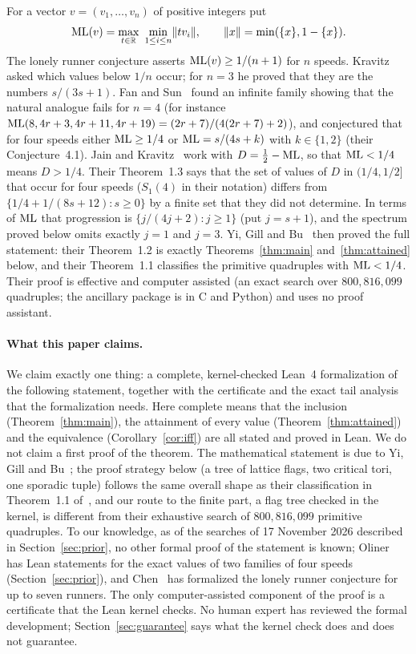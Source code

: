 \documentclass[11pt]{article}
\theoremstyle{remark}
\newcommand{\R}{\mathbb{R}}
\newcommand{\dist}[1]{\lVert #1\rVert}
\begin{document}
For a vector $v=(v_1,\dots,v_n)$ of positive integers put
\[
\ML(v)=\max_{t\in\R}\ \min_{1\le i\le n}\dist{tv_i},\qquad \dist{x}=\min(\{x\},1-\{x\}).
\]
The lonely runner conjecture asserts $\mathrm{ML}(v)\ge 1/(n+1)$ for $n$ speeds. Kravitz~\cite{Kravitz21} asked which values below $1/n$ occur; for $n=3$ he proved that they are the numbers $s/(3s+1)$. Fan and Sun~\cite{FanSun} found an infinite family showing that the natural analogue fails for $n=4$ (for instance $\mathrm{ML}(8,4r+3,4r+11,4r+19)=(2r+7)/(4(2r+7)+2)$), and conjectured that for four speeds either $\mathrm{ML}\ge1/4$ or $\mathrm{ML}=s/(4s+k)$ with $k\in\{1,2\}$ (their Conjecture~4.1). Jain and Kravitz~\cite{JK} work with $D=\tfrac12-\mathrm{ML}$, so that $\mathrm{ML}<1/4$ means $D>1/4$. Their Theorem~1.3 says that the set of values of $D$ in $(1/4,1/2]$ that occur for four speeds ($S_1(4)$ in their notation) differs from $\{1/4+1/(8s+12):s\ge0\}$ by a finite set that they did not determine. In terms of $\mathrm{ML}$ that progression is $\{j/(4j+2):j\ge1\}$ (put $j=s+1$), and the spectrum proved below omits exactly $j=1$ and $j=3$. Yi, Gill and Bu~\cite{YGB} then proved the full statement: their Theorem~1.2 is exactly Theorems~\ref{thm:main} and~\ref{thm:attained} below, and their Theorem~1.1 classifies the primitive quadruples with $\mathrm{ML}<1/4$. Their proof is effective and computer assisted (an exact search over $800{,}816{,}099$ quadruples; the ancillary package is in C and Python) and uses no proof assistant.

\paragraph{What this paper claims.} We claim exactly one thing: a complete, kernel-checked Lean~4 formalization of the following statement, together with the certificate and the exact tail analysis that the formalization needs. Here complete means that the inclusion (Theorem~\ref{thm:main}), the attainment of every value (Theorem~\ref{thm:attained}) and the equivalence (Corollary~\ref{cor:iff}) are all stated and proved in Lean. We do not claim a first proof of the theorem. The mathematical statement is due to Yi, Gill and Bu~\cite[Theorem~1.2]{YGB}; the proof strategy below (a tree of lattice flags, two critical tori, one sporadic tuple) follows the same overall shape as their classification in Theorem~1.1 of~\cite{YGB}, and our route to the finite part, a flag tree checked in the kernel, is different from their exhaustive search of $800{,}816{,}099$ primitive quadruples. To our knowledge, as of the searches of 17 November 2026 described in Section~\ref{sec:prior}, no other formal proof of the statement is known; Oliner~\cite{Oliner} has Lean statements for the exact values of two families of four speeds (Section~\ref{sec:prior}), and Chen~\cite{Chen} has formalized the lonely runner conjecture for up to seven runners. The only computer-assisted component of the proof is a certificate that the Lean kernel checks. No human expert has reviewed the formal development; Section~\ref{sec:guarantee} says what the kernel check does and does not guarantee.
\end{document}
